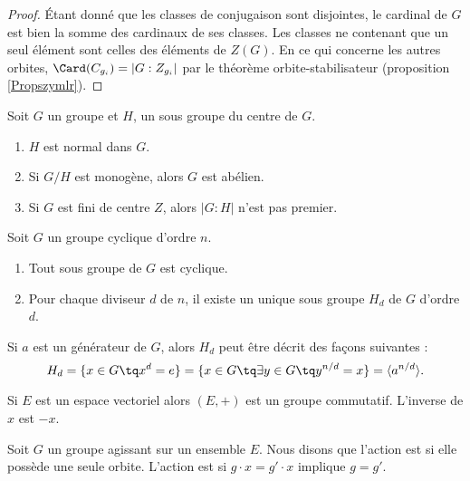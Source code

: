 \begin{proof}
    Étant donné que les classes de conjugaison sont disjointes, le cardinal de \( G\) est bien la somme des cardinaux de ses classes. Les classes ne contenant que un seul élément sont celles des éléments de \( Z(G)\). En ce qui concerne les autres orbites, \( \Card(C_{g_i})=| G:Z_{g_i} |\) par le théorème orbite-stabilisateur (proposition \ref{Propszymlr}).
\end{proof}

\begin{proposition}
    Soit \( G\) un groupe et \( H\), un sous groupe du centre de \( G\).
    \begin{enumerate}
        \item
            \( H\) est normal dans \( G\).
        \item
            Si \( G/H\) est monogène, alors \( G\) est abélien.
        \item
            Si \( G\) est fini de centre \( Z\), alors \( | G:H |\) n'est pas premier.
    \end{enumerate}
\end{proposition}

\begin{theorem}
    Soit \( G\) un groupe cyclique d'ordre \( n\).
    \begin{enumerate}
        \item
            Tout sous groupe de \( G\) est cyclique.
        \item 
            Pour chaque diviseur \( d\) de \( n\), il existe un unique sous groupe \( H_d\) de \( G\) d'ordre \( d\).
    \end{enumerate}
    Si \( a\) est un générateur de \( G\), alors \( H_d\) peut être décrit des façons suivantes :
    \begin{equation}
        H_d=\{ x\in G\tq x^d=e \}=\{ x\in G\tq\exists y\in G\tq y^{n/d}=x \}=\langle a^{n/d}\rangle.
    \end{equation}
\end{theorem}

\begin{example}     \label{ExemMaKdwt}
    Si \( E\) est un espace vectoriel alors \( (E,+)\) est un groupe commutatif. L'inverse de \( x\) est \( -x\).
\end{example}

\begin{definition}
    Soit \( G\) un groupe agissant sur un ensemble \( E\). Nous disons que l'action est  si elle possède une seule orbite. L'action est  si \( g\cdot x=g'\cdot x\) implique \( g=g'\).
\end{definition}

